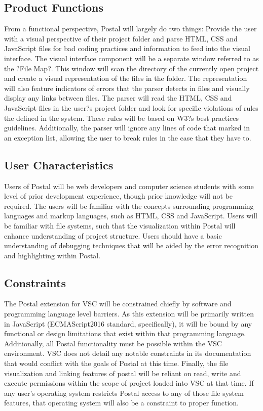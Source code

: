 \documentclass[letterpaper,10pt,titlepage,draftclsnofoot,onecolumn,onesided] {IEEEtran}
\begin{document}
\subsection{Product Functions}
From a functional perspective, Postal will largely do two things: Provide the user with a visual perspective of their project folder and parse HTML, CSS and JavaScript files for bad coding practices and information to feed into the visual interface. 
The visual interface component will be a separate window referred to as the ?File Map?. This window will scan the directory of the currently open project and create a visual representation of the files in the folder. The representation will also feature indicators of errors that the parser detects in files and visually display any links between files.
The parser will read the HTML, CSS and JavaScript files in the user?s project folder and look for specific violations of rules the defined in the system. These rules will be based on W3?s best practices guidelines. Additionally, the parser will ignore any lines of code that marked in an exception list, allowing the user to break rules in the case that they have to.

\subsection{User Characteristics}
Users of Postal will be web developers and computer science students with some level of prior development experience, though prior knowledge will not be required. The users will be familiar with the concepts surrounding programming languages and markup languages, such as HTML, CSS and JavaScript. Users will be familiar with file systems, such that the visualization within Postal will enhance understanding of project structure. Users should have a basic understanding of debugging techniques that will be aided by the error recognition and highlighting within Postal.

\subsection{Constraints}
The Postal extension for VSC will be constrained chiefly by software and programming language level barriers. As this extension will be primarily written in JavaScript (ECMAScript2016 standard, specifically), it will be bound by any functional or design limitations that exist within that programming language. Additionally, all Postal functionality must be possible within the VSC environment. VSC does not detail any notable constraints in its documentation that would conflict with the goals of Postal at this time. Finally, the file visualization and linking features of postal will be reliant on read, write and execute permissions within the scope of project loaded into VSC at that time. If any user's operating system restricts Postal access to any of those file system features, that operating system will also be a constraint to proper function.
\end{document}
